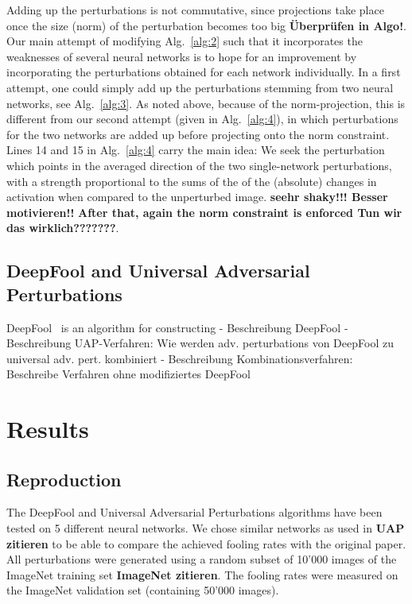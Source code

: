 \documentclass[runningheads]{llncs}
\begin{document}
Adding up the perturbations is not commutative, since projections take place once the size (norm) of the perturbation becomes too big {\bf Überprüfen in Algo!}. 
Our main attempt of modifying Alg.~\ref{alg:2} such that it incorporates the weaknesses of several neural networks is to hope for an improvement by incorporating the perturbations obtained for each network individually. In a first attempt, one could simply add up the perturbations stemming from two neural networks, see Alg.~\ref{alg:3}. As noted above, because of the norm-projection, this is different from our second attempt (given in Alg.~\ref{alg:4}), in which perturbations for the two networks are added up before projecting onto the norm constraint. Lines 14 and 15 in Alg.~\ref{alg:4} carry the main idea: We seek the perturbation which points in the averaged direction of the two single-network perturbations, with a strength proportional to the sums of the of the (absolute)  changes in activation when compared to the unperturbed image. {\bf seehr shaky!!! Besser motivieren!!}
{\bf After that, again the norm constraint is enforced Tun wir das wirklich???????}.


\subsection{DeepFool and Universal Adversarial Perturbations}
DeepFool~\cite{DeepFool-Moosavi-Dezfooli15} is an algorithm for constructing
- Beschreibung DeepFool
- Beschreibung UAP-Verfahren: Wie werden adv. perturbations von DeepFool zu universal adv. pert. kombiniert
- Beschreibung Kombinationsverfahren: Beschreibe Verfahren ohne modifiziertes DeepFool
\section{Results}

\subsection{Reproduction}

The DeepFool and Universal Adversarial Perturbations algorithms have been tested on 5 different neural networks. We chose similar networks as used in {\bf UAP zitieren} to be able to compare the achieved fooling rates with the original paper. All perturbations were generated using a random subset of 10'000 images of the ImageNet training set {\bf ImageNet zitieren}. The fooling rates were measured on the ImageNet validation set (containing 50'000 images).
\end{document}
